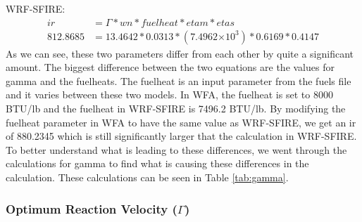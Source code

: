 \documentclass{article}
\newcommand\tenpow[1]{\ensuremath{{\times}10^{#1}}}
\begin{document}
WRF-SFIRE:
\begin{equation}
\label{IR_WRF_2}
	\begin{split}
		ir       &= \Gamma * wn * fuelheat * etam * etas \\
		812.8685 &= 13.4642 * 0.0313 * (7.4962 \tenpow{3}) * 0.6169 * 0.4147
	\end{split}
\end{equation}
\fi
As we can see, these two parameters differ from each other by quite a significant amount. The biggest difference between the two equations are the values for gamma and the fuelheats. The fuelheat is an input parameter from the fuels file and it varies between these two models. In WFA, the fuelheat is set to 8000 BTU/lb and the fuelheat in WRF-SFIRE is 7496.2 BTU/lb. By modifying the fuelheat parameter in WFA to have the same value as WRF-SFIRE, we get an ir of 880.2345 which is still significantly larger that the calculation in WRF-SFIRE. To better understand what is leading to these differences, we went through the calculations for gamma to find what is causing these differences in the calculation. These calculations can be seen in Table \ref{tab:gamma}. 
\subsubsection{Optimum Reaction Velocity ($\Gamma$)}
\end{document}
